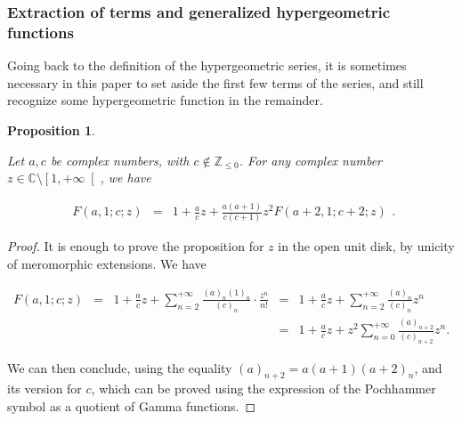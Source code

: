 \documentclass{jams-l}
\newtheorem{proposition}[theorem]{Proposition}
\theoremstyle{definition}
\theoremstyle{remark}
\numberwithin{equation}{section}
\begin{document}
        
        \subsubsection{Extraction of terms and generalized hypergeometric functions}
        
            Going back to the definition of the hypergeometric series, it is sometimes necessary in this paper to set aside the first few terms of the series, and still recognize some hypergeometric function in the remainder.
            
            \begin{proposition}
            \label{PropExtractionTerms}
                    
                Let $a, c$ be complex numbers, with $c \not \in \mathbb{Z}_{\leqslant 0}$. For any complex number $z \in \mathbb{C} \setminus \left[ 1, + \infty \right[$, we have
                
                \[ \begin{array}{lll}
                        F \left( a, 1; c; z \right) & = & 1 + \frac{a}{c} z + \frac{a \left( a + 1 \right)}{c \left( c + 1 \right)} z^2 F \left( a + 2, 1; c + 2; z \right)
                    \end{array} . \]
                    
            \end{proposition}
            
            \begin{proof}
            
                It is enough to prove the proposition for $z$ in the open unit disk, by unicity of meromorphic extensions. We have
                
                \[ \begin{array}{lllll}
                        F \left( a, 1; c; z \right) & = & 1 + \frac{a}{c} z + \sum\limits_{n=2}^{+ \infty} \frac{\left( a \right)_n \left( 1 \right)_n}{\left( c \right)_n} \cdot \frac{z^n}{n!} & = & 1 + \frac{a}{c} z + \sum\limits_{n=2}^{+ \infty} \frac{\left( a \right)_n}{\left( c \right)_n} z^n \\[1em]
                        
                        &&& = & 1 + \frac{a}{c} z + z^2 \sum\limits_{n=0}^{+ \infty} \frac{\left( a \right)_{n+2}}{\left( c \right)_{n+2}} z^n.
                    \end{array} \]
                
                \noindent We can then conclude, using the equality $\left( a \right)_{n+2} = a \left( a+1 \right) \left( a+2 \right)_n$, and its version for $c$, which can be proved using the expression of the Pochhammer symbol as a quotient of Gamma functions.
            
            \end{proof}
            
\end{document}
